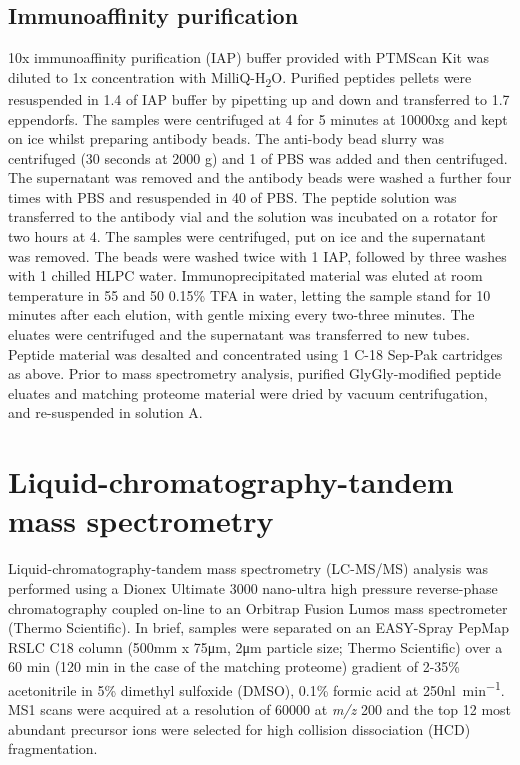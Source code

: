 \subsection{Immunoaffinity purification}
10x immunoaffinity purification (IAP) buffer provided with PTMScan Kit was diluted to 1x concentration with MilliQ-H\textsubscript{2}O.
Purified peptides pellets were resuspended in 1.4\ml{} of IAP buffer by pipetting up and down and transferred to 1.7\ml{} eppendorfs.
The samples were centrifuged at 4\C{} for 5 minutes at 10000xg and kept on ice whilst preparing antibody beads.
The anti-body bead slurry was centrifuged (30 seconds at 2000 g) and 1\ml{} of PBS was added and then centrifuged.
The supernatant was removed and the antibody beads were washed a further four times with PBS and resuspended in 40\ul{} of PBS.
The peptide solution was transferred to the antibody vial and the solution was incubated on a rotator for two hours at 4\C{}.
The samples were centrifuged, put on ice and the supernatant was removed.
The beads were washed twice with 1\ml{} IAP, followed by three washes with 1\ml{} chilled HLPC water.
Immunoprecipitated material was eluted at room temperature in 55\ul{} and 50\ul{} 0.15\% TFA in water, letting the sample stand for 10 minutes after each elution, with gentle mixing every two-three minutes.
The eluates were centrifuged and the supernatant was transferred to new tubes.
Peptide material was desalted and concentrated using 1\ml{} C-18 Sep-Pak cartridges as above.
Prior to mass spectrometry analysis, purified GlyGly-modified peptide eluates and matching proteome material were dried by vacuum centrifugation, and re-suspended in solution A.
%

\section{Liquid-chromatography-tandem mass spectrometry}
Liquid-chromatography-tandem mass spectrometry (LC-MS/MS) analysis was performed using a Dionex Ultimate 3000 nano-ultra high pressure reverse-phase chromatography coupled on-line to an Orbitrap Fusion Lumos mass spectrometer (Thermo Scientific).
In brief, samples were separated on an EASY-Spray PepMap RSLC C18 column (500\si{\mm} x 75\si{\um}, 2\si{\um} particle size; Thermo Scientific) over a 60 min (120 min in the case of the matching proteome) gradient of 2-35\% acetonitrile in 5\% dimethyl sulfoxide (DMSO), 0.1\% formic acid at 250\si{\nano\litre\per\minute}.
MS1 scans were acquired at a resolution of 60000 at \textit{m/z} 200 and the top 12 most abundant precursor ions were selected for high collision dissociation (HCD) fragmentation.

